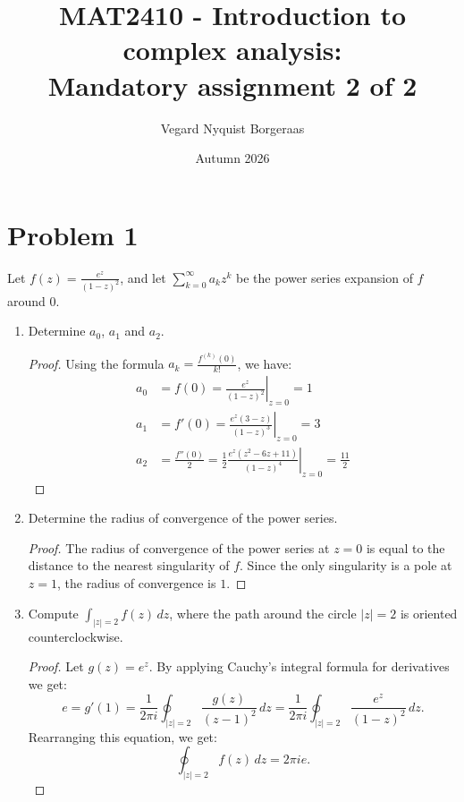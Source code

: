 \documentclass[a4paper,11pt]{article}
\title{MAT2410 - Introduction to complex analysis: \\ Mandatory assignment 2 of 2}
\author{Vegard Nyquist Borgeraas}
\date{Autumn 2026}
\begin{document}
\maketitle

\section*{Problem 1}
Let $f(z)=\frac{e^{z}}{(1-z)^{2}}$, and let $\sum_{k=0}^{\infty}a_{k}z^{k}$ be the power series expansion of $f$ around $0$.

\begin{enumerate}[label=\textbf{(\alph*)}]
    \item Determine $a_{0}$, $a_{1}$ and $a_{2}$.
    \begin{proof}
        Using the formula $a_k = \frac{f^{(k)}(0)}{k!}$, we have:
        \begin{align*}
            a_{0} &= f(0) = \left. \frac{e^z}{(1-z)^2} \right|_{z=0} = 1 \\
            a_{1} &= f'(0) = \left. \frac{e^z(3-z)}{(1-z)^3} \right|_{z=0} = 3 \\
            a_{2} &= \frac{f''(0)}{2} = \frac{1}{2} \left. \frac{e^z(z^2-6z+11)}{(1-z)^4} \right|_{z=0} = \frac{11}{2}
        \end{align*}
    \end{proof}

    \item Determine the radius of convergence of the power series.
    \begin{proof}
        The radius of convergence of the power series at $z=0$ is equal to the distance to the nearest singularity of $f$. Since the only singularity is a pole at $z=1$, the radius of convergence is $1$.
    \end{proof}
    
    \item Compute $\int_{|z|=2}f(z)\,dz$, where the path around the circle $|z|=2$ is oriented counterclockwise.
    \begin{proof}
        Let $g(z) = e^z$. By applying Cauchy's integral formula for derivatives we get:
        \[
            e = g'(1) = \frac{1}{2\pi i}\oint_{|z|=2} \frac{g(z)}{(z-1)^2}\,dz = \frac{1}{2\pi i}\oint_{|z|=2} \frac{e^z}{(1-z)^2}\,dz.
        \]
        Rearranging this equation, we get:
        \[
            \oint_{|z|=2} f(z)\,dz = 2\pi i e.
        \]
    \end{proof}
\end{enumerate}
\end{document}
